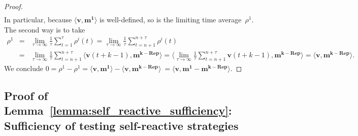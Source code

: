 \documentclass[11pt]{article}
\theoremstyle{plainCl1}
\theoremstyle{plainCl2}
\begin{document}
\begin{proof}
\begin{equation*}
\begin{array}{rcl}
\end{array}
\end{equation*}
In particular, because $\big\langle \mathbf{v},\mathbf{m^1} \big\rangle$ is well-defined, so is the limiting time average~$\rho^1$. The second way is to take
\begin{equation*}
\begin{array}{rcl}
\rho^1 &= &\displaystyle 
\lim_{\tau \to \infty} \frac{1}{\tau} \sum_{t=1}^\tau \rho^i(t) 
= \lim_{\tau \to \infty} \frac{1}{\tau} \sum_{t=n+1}^{n+\tau} \rho^i(t)\\[0.5cm]
&= &\displaystyle 
\lim_{\tau \to \infty} \frac{1}{\tau} \sum_{t=n+1}^{n+\tau}  \big\langle \mathbf{v}(t\!+\!k\!-\!1) ,  \mathbf{m^{k-\text{Rep}}}\big\rangle 
=  \big\langle  \lim_{\tau \to \infty} \frac{1}{\tau} \sum_{t=n+1}^{n+\tau} \mathbf{v}(t\!+\!k\!-\!1) ,  \mathbf{m^{k-\text{Rep}}}\big\rangle
= \big\langle \mathbf{v},  \mathbf{m^{k-\text{Rep}}} \big\rangle.
\end{array}
\end{equation*}
We conclude
$
0 = \rho^1 \!-\! \rho^1 = \big\langle \mathbf{v},\mathbf{m^1} \big\rangle\!-\!\big\langle \mathbf{v},  \mathbf{m^{k-\text{Rep}}} \big\rangle\ = \big\langle \mathbf{v}, \mathbf{m^1}\!-\!\mathbf{m^{k-\text{Rep}}} \big\rangle.
$
\end{proof}





\subsection{Proof of Lemma~\ref{lemma:self_reactive_sufficiency}: Sufficiency of testing self-reactive strategies}
\end{document}
